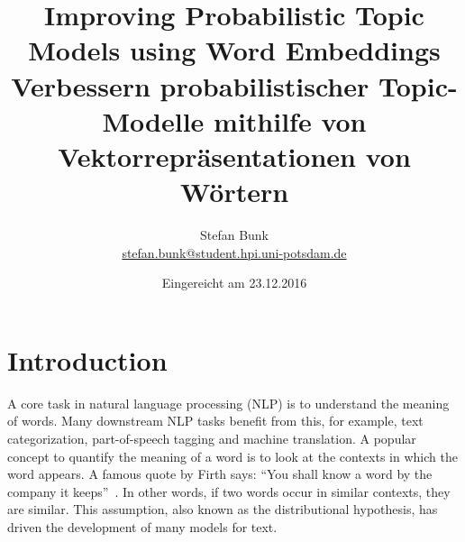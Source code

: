 \documentclass[
        a4paper,
        titlepage,
        twoside,
        parskip
        ]{scrbook}
\title{Improving Probabilistic Topic Models using Word Embeddings
\\ \bigskip
\large{Verbessern probabilistischer Topic-Modelle mithilfe von Vektorrepräsentationen von Wörtern}}
\author{Stefan Bunk\\{\small{\url{stefan.bunk@student.hpi.uni-potsdam.de}}}}
\date{Eingereicht am 23.12.2016}
\theoremstyle{break}
\begin{document}
\maketitle
\cleardoublepage


\setcounter{secnumdepth}{4}
\setcounter{tocdepth}{4}
\tableofcontents

\chapter{Introduction}
\label{sec:introduction}

A core task in natural language processing (NLP) is to understand the meaning of words.
Many downstream NLP tasks benefit from this, for example, text categorization, part-of-speech tagging and machine translation.
A popular concept to quantify the meaning of a word is to look at the contexts in which the word appears.
A famous quote by Firth says: ``You shall know a word by the company it keeps''~\cite{Firth1957}.
In other words, if two words occur in similar contexts, they are similar.
This assumption, also known as the distributional hypothesis, has driven the development of many models for text.
\end{document}
